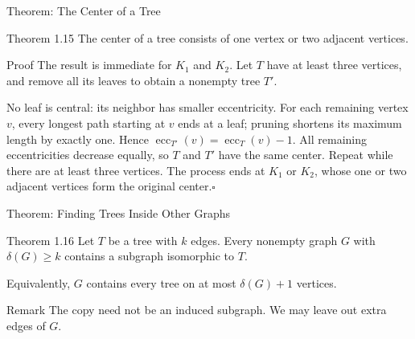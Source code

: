 \documentclass[aspectratio=169,11pt]{beamer}
\begin{document}
\begin{frame}[t]{Theorem: The Center of a Tree}
\large
\begin{block}{Theorem 1.15}
The center of a tree consists of one vertex or two adjacent vertices.
\end{block}
\begin{block}{Proof}
\small
The result is immediate for $K_1$ and $K_2$. Let $T$ have at least three vertices, and remove all its leaves to obtain a nonempty tree $T'$.
\par\smallskip
No leaf is central: its neighbor has smaller eccentricity. For each remaining vertex $v$, every longest path starting at $v$ ends at a leaf; pruning shortens its maximum length by exactly one. Hence $\operatorname{ecc}_{T'}(v)=\operatorname{ecc}_T(v)-1$.
All remaining eccentricities decrease equally, so $T$ and $T'$ have the same center. Repeat while there are at least three vertices. The process ends at $K_1$ or $K_2$, whose one or two adjacent vertices form the original center.\hfill$\square$
\par\smallskip
{\centering
{}\par}
\end{block}
\end{frame}

\begin{frame}{Theorem: Finding Trees Inside Other Graphs}
\large
\begin{block}{Theorem 1.16}
Let $T$ be a tree with $k$ edges. Every nonempty graph $G$ with $\delta(G)\ge k$ contains a subgraph isomorphic to $T$.
\end{block}
\par\medskip Equivalently, $G$ contains every tree on at most $\delta(G)+1$ vertices.\begin{block}{Remark}
The copy need not be an induced subgraph. We may leave out extra edges of $G$.
\end{block}

\end{frame}
\end{document}
